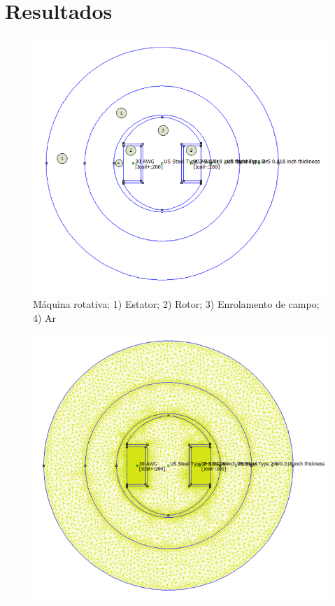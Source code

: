 \section{Resultados}
\begin{figure}[H]
\centering
\includegraphics[scale=0.6]{img/assig4/femm_des.png}
\caption[Máquina rotativa]{Máquina rotativa: 1) Estator; 2) Rotor; 3) Enrolamento de campo; 4) Ar }
\label{}
\end{figure}

\begin{figure}[H]
\centering
\includegraphics[scale=0.4]{img/assig4/triang.png}
\caption[]{}
\label{}
\end{figure}

